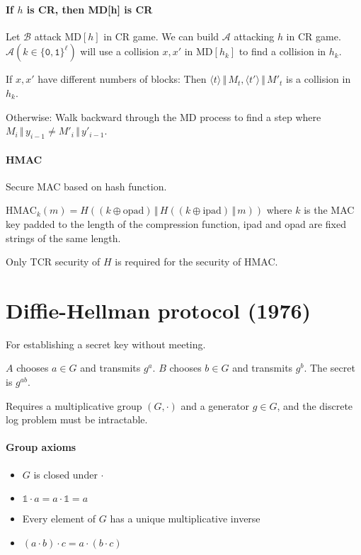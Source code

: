 \documentclass[11pt]{article}
\newcommand{\bit}{\ensuremath{\{\texttt{0},\texttt{1}\}}}
\newcommand{\ang}[1]{\ensuremath{\langle#1\rangle}}
\newcommand{\I}{\ensuremath{\mathds{1}}}
\theoremstyle{remark}
\begin{document}
\paragraph{If $h$ is CR, then MD[h] is CR}
Let $\mathcal{B}$ attack MD$[h]$ in CR game.
We can build $\mathcal{A}$ attacking $h$ in CR game.
$\mathcal{A}(k\in\bit^\ell)$ will use a collision
$x,x'$ in MD$[h_k]$ to find a collision in $h_k$.

If $x,x'$ have different numbers of blocks:
Then $\ang{t}\,\Vert\,M_t, \ang{t'}\,\Vert\,M'_t$ is a collision in $h_k$.

Otherwise: Walk backward through the MD process to find a step
where $M_i\,\Vert\,y_{i-1} \neq M'_i\,\Vert\,y'_{i-1}$.

\paragraph{HMAC} Secure MAC based on hash function.

$\text{HMAC}_k(m) = H(
  (k \oplus \text{opad})
  \,\Vert\,
  H(
    (k \oplus \text{ipad})
    \,\Vert\,
    m
  )
)$
where $k$ is the MAC key padded to the length of the compression function,
ipad and opad are fixed strings of the same length.

Only TCR security of $H$ is required for the security of HMAC.

\section{Diffie-Hellman protocol (1976)}

For establishing a secret key without meeting.

$A$ chooses $a \in G$ and transmits $g^a$.
$B$ chooses $b \in G$ and transmits $g^b$.
The secret is $g^{ab}$.

Requires a multiplicative group $(G,\cdot)$
and a generator $g\in G$,
and the discrete log problem must be intractable.

\paragraph{Group axioms}

\begin{itemize}
\item $G$ is closed under $\cdot$
\item $\I\cdot a=a\cdot\I=a$
\item Every element of $G$ has a unique multiplicative inverse
\item $(a\cdot b)\cdot c=a\cdot(b\cdot c)$
\end{itemize}
\end{document}
